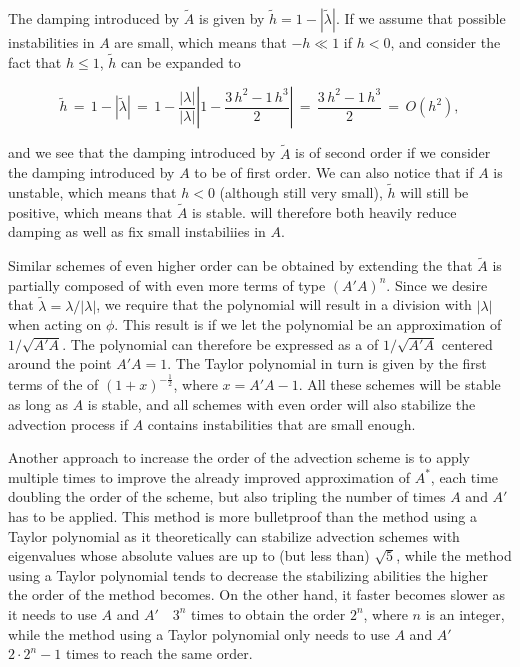 The damping introduced by $\tilde{A}$ is given by $\tilde{h} = 1 - |\tilde{\lambda}|$. If we assume that possible instabilities in $A$ are small, which means that $-h \ll 1$ if $h < 0$, and consider the fact that $h \leq 1$, $\tilde{h}$ can be expanded to

\begin{equation}
\tilde{h} \,=\, 1 - |\tilde{\lambda}| \,=\, 1 - \frac{|\lambda|}{|\lambda|}\left|1 - \displaystyle\frac{3\,h^2 - 1\,h^3}{2}\right| \,=\, \displaystyle\frac{3\,h^2 - 1\,h^3}{2} \,=\, O(h^2),
\end{equation}

and we see that the damping introduced by $\tilde{A}$ is of second order if we consider the damping introduced by $A$ to be of first order. We can also notice that if $A$ is unstable, which means that $h < 0$ (although still very small), $\tilde{h}$ will still be positive, which means that $\tilde{A}$ is stable. \BFECC will therefore both heavily reduce damping as well as fix small instabiliies in $A$.

Similar schemes of even higher order can be obtained by extending the \polynomial that $\tilde{A}$ is partially composed of with even more terms of type $(A'A)^n$. Since we desire that $\tilde{\lambda} = \lambda/|\lambda|$, we require that the polynomial will result in a division with $|\lambda|$ when acting on $\phi$. This result is \approximated if we let the polynomial be an approximation of $1/\sqrt{A'A}$. The polynomial can therefore be expressed as a  of $1/\sqrt{A'A}$ centered around the point $A'A = 1$. The Taylor polynomial in turn is given by the first terms of the  of $(1+x)^{-\frac{1}{2}}$, where $x = A'A - 1$. All these schemes will be stable as long as $A$ is stable, and all schemes with even order will also stabilize the advection process if $A$ contains instabilities that are small enough.

Another approach to increase the order of the advection scheme is to apply \BFECC multiple times to improve the already improved approximation of $A^*$, each time doubling the order of the scheme, but also tripling the number of times $A$ and $A'$ has to be applied. This method is more bulletproof than the method using a Taylor polynomial as it theoretically can stabilize advection schemes with eigenvalues whose absolute values are up to (but less than) $\sqrt{5}$, while the method using a Taylor polynomial tends to decrease the stabilizing abilities the higher the order of the method becomes. On the other hand, it faster becomes slower as it needs to use $A$ and $A'$\ \ $3^n$ times to obtain the order $2^n$, where $n$ is an integer, while the method using a Taylor polynomial only needs to use $A$ and $A'$\ \ $2\cdot 2^n - 1$ times to reach the same order.

